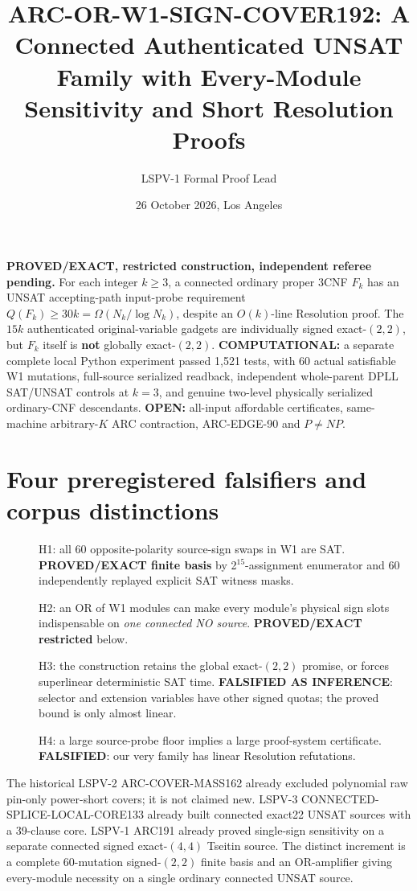 \documentclass[11pt]{article}
\title{ARC-OR-W1-SIGN-COVER192: A Connected Authenticated UNSAT Family with Every-Module Sensitivity and Short Resolution Proofs}
\author{LSPV-1 Formal Proof Lead}
\date{26 October 2026, Los Angeles}
\begin{document}
\maketitle
\noindent\textbf{PROVED/EXACT, restricted construction, independent referee pending.}
For each integer $k\ge3$, a connected ordinary proper 3CNF $F_k$ has an
UNSAT accepting-path input-probe requirement $Q(F_k)\ge30k=\Omega(N_k/\log N_k)$,
despite an $O(k)$-line Resolution proof.
The $15k$ authenticated original-variable gadgets are individually
signed exact-$(2,2)$, but $F_k$ itself is \textbf{not} globally exact-$(2,2)$.
\textbf{COMPUTATIONAL:} a separate complete local Python experiment passed
1,521 tests, with 60 actual satisfiable W1 mutations, full-source serialized
readback, independent whole-parent DPLL SAT/UNSAT controls at $k=3$, and
genuine two-level physically serialized ordinary-CNF descendants.
\textbf{OPEN:} all-input affordable certificates, same-machine arbitrary-$K$
ARC contraction, ARC-EDGE-90 and $P\ne NP$.

\section{Four preregistered falsifiers and corpus distinctions}
\begin{description}
\item[] H1: all 60 opposite-polarity source-sign swaps in W1 are SAT.
\textbf{PROVED/EXACT finite basis} by 2$^{15}$-assignment enumerator and
60 independently replayed explicit SAT witness masks.
\item[] H2: an OR of W1 modules can make every module's physical sign
slots indispensable on \emph{one connected NO source}.
\textbf{PROVED/EXACT restricted} below.
\item[] H3: the construction retains the global exact-$(2,2)$ promise,
or forces superlinear deterministic SAT time.
\textbf{FALSIFIED AS INFERENCE}: selector and extension variables
have other signed quotas; the proved bound is only almost linear.
\item[] H4: a large source-probe floor implies a large proof-system certificate.
\textbf{FALSIFIED}: our very family has linear Resolution refutations.
\end{description}
The historical LSPV-2 ARC-COVER-MASS162 already excluded polynomial
raw pin-only power-short covers; it is not claimed new. LSPV-3
CONNECTED-SPLICE-LOCAL-CORE133 already built connected exact22 UNSAT
sources with a 39-clause core. LSPV-1 ARC191 already proved
single-sign sensitivity on a separate connected signed exact-$(4,4)$
Tseitin source. The distinct increment is a complete 60-mutation
signed-$(2,2)$ finite basis and an OR-amplifier giving every-module
necessity on a single ordinary connected UNSAT source.
\end{document}
